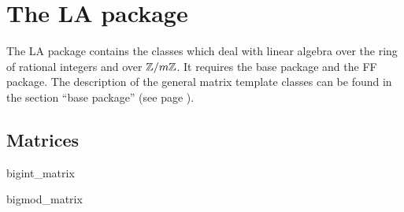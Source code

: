%
%
%
%

\part*{The \LiDIA LA package}\label{LiDIA-LA}

The \LiDIA LA package contains the classes which deal with linear algebra over the ring of
rational integers and over $\mathbb{Z}/m\mathbb{Z}$. It requires the \LiDIA base package and the \LiDIA FF
package.  The description of the general matrix template classes can be found in the section
``\LiDIA base package'' (see page \pageref{LiDIA-base:matrices}).

\chapter{Matrices}

\begin{class}{bigint_matrix}
  
\end{class}

\begin{class}{bigmod_matrix}
  
\end{class}
